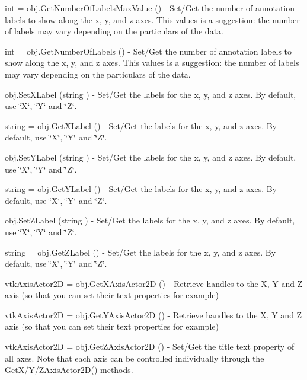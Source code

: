 \begin{DoxyItemize}
\item {\ttfamily int = obj.\-Get\-Number\-Of\-Labels\-Max\-Value ()} -\/ Set/\-Get the number of annotation labels to show along the x, y, and z axes. This values is a suggestion\-: the number of labels may vary depending on the particulars of the data.  
\item {\ttfamily int = obj.\-Get\-Number\-Of\-Labels ()} -\/ Set/\-Get the number of annotation labels to show along the x, y, and z axes. This values is a suggestion\-: the number of labels may vary depending on the particulars of the data.  
\item {\ttfamily obj.\-Set\-X\-Label (string )} -\/ Set/\-Get the labels for the x, y, and z axes. By default, use \char`\"{}\-X\char`\"{}, \char`\"{}\-Y\char`\"{} and \char`\"{}\-Z\char`\"{}.  
\item {\ttfamily string = obj.\-Get\-X\-Label ()} -\/ Set/\-Get the labels for the x, y, and z axes. By default, use \char`\"{}\-X\char`\"{}, \char`\"{}\-Y\char`\"{} and \char`\"{}\-Z\char`\"{}.  
\item {\ttfamily obj.\-Set\-Y\-Label (string )} -\/ Set/\-Get the labels for the x, y, and z axes. By default, use \char`\"{}\-X\char`\"{}, \char`\"{}\-Y\char`\"{} and \char`\"{}\-Z\char`\"{}.  
\item {\ttfamily string = obj.\-Get\-Y\-Label ()} -\/ Set/\-Get the labels for the x, y, and z axes. By default, use \char`\"{}\-X\char`\"{}, \char`\"{}\-Y\char`\"{} and \char`\"{}\-Z\char`\"{}.  
\item {\ttfamily obj.\-Set\-Z\-Label (string )} -\/ Set/\-Get the labels for the x, y, and z axes. By default, use \char`\"{}\-X\char`\"{}, \char`\"{}\-Y\char`\"{} and \char`\"{}\-Z\char`\"{}.  
\item {\ttfamily string = obj.\-Get\-Z\-Label ()} -\/ Set/\-Get the labels for the x, y, and z axes. By default, use \char`\"{}\-X\char`\"{}, \char`\"{}\-Y\char`\"{} and \char`\"{}\-Z\char`\"{}.  
\item {\ttfamily vtk\-Axis\-Actor2\-D = obj.\-Get\-X\-Axis\-Actor2\-D ()} -\/ Retrieve handles to the X, Y and Z axis (so that you can set their text properties for example)  
\item {\ttfamily vtk\-Axis\-Actor2\-D = obj.\-Get\-Y\-Axis\-Actor2\-D ()} -\/ Retrieve handles to the X, Y and Z axis (so that you can set their text properties for example)  
\item {\ttfamily vtk\-Axis\-Actor2\-D = obj.\-Get\-Z\-Axis\-Actor2\-D ()} -\/ Set/\-Get the title text property of all axes. Note that each axis can be controlled individually through the Get\-X/\-Y/\-Z\-Axis\-Actor2\-D() methods.  

\end{DoxyItemize}
